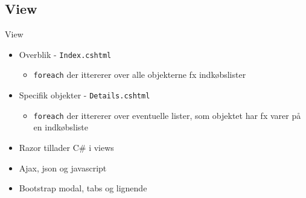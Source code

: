 \subsection{View}
\begin{frame}{View}
	\begin{itemize}
		\item Overblik - \texttt{Index.cshtml}
		\begin{itemize}
			\item \texttt{foreach} der ittererer over alle objekterne fx indkøbslister
		\end{itemize}
		\item Specifik objekter - \texttt{Details.cshtml}
		\begin{itemize}
			\item \texttt{foreach} der ittererer over eventuelle lister, som objektet har fx varer på en indkøbsliste
		\end{itemize}
		\item Razor tillader C\# i views
		\item Ajax, json og javascript
		\item Bootstrap modal, tabs og lignende
	\end{itemize}
\end{frame}
